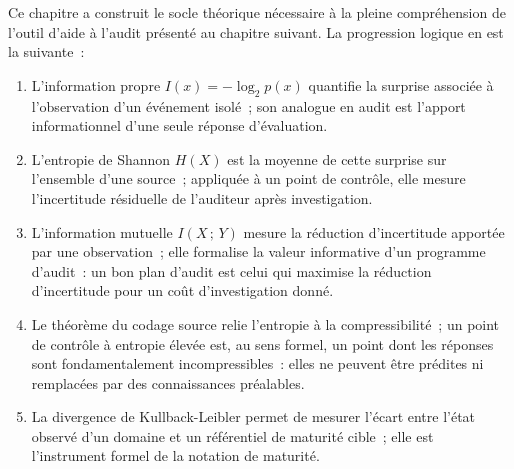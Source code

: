 Ce chapitre a construit le socle théorique nécessaire à la pleine compréhension
de l'outil d'aide à l'audit présenté au chapitre suivant. La progression logique
en est la suivante~:

\begin{enumerate}
  \item L'information propre $I(x) = -\log_2 p(x)$ quantifie la surprise associée
        à l'observation d'un événement isolé~; son analogue en audit est l'apport
        informationnel d'une seule réponse d'évaluation.
  \item L'entropie de Shannon $H(X)$ est la moyenne de cette surprise sur
        l'ensemble d'une source~; appliquée à un point de contrôle, elle mesure
        l'incertitude résiduelle de l'auditeur après investigation.
  \item L'information mutuelle $I(X\,;\,Y)$ mesure la réduction d'incertitude
        apportée par une observation~; elle formalise la valeur informative d'un
        programme d'audit~: un bon plan d'audit est celui qui maximise la
        réduction d'incertitude pour un coût d'investigation donné.
  \item Le théorème du codage source relie l'entropie à la compressibilité~;
        un point de contrôle à entropie élevée est, au sens formel, un point
        dont les réponses sont fondamentalement incompressibles~: elles ne peuvent
        être prédites ni remplacées par des connaissances préalables.
  \item La divergence de Kullback-Leibler permet de mesurer l'écart entre l'état
        observé d'un domaine et un référentiel de maturité cible~; elle est
        l'instrument formel de la notation de maturité.
\end{enumerate}

